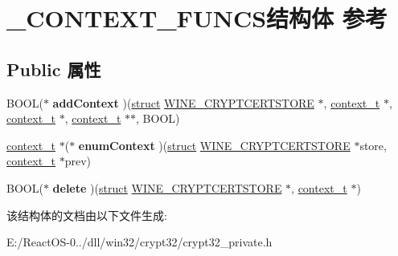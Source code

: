 \hypertarget{struct___c_o_n_t_e_x_t___f_u_n_c_s}{}\section{\+\_\+\+C\+O\+N\+T\+E\+X\+T\+\_\+\+F\+U\+N\+C\+S结构体 参考}
\label{struct___c_o_n_t_e_x_t___f_u_n_c_s}
\subsection*{Public 属性}
\begin{DoxyCompactItemize}
\item 
\mbox{\label{struct___c_o_n_t_e_x_t___f_u_n_c_s_adbf3e6967b6d243a80af35f9530ba387}} 
B\+O\+OL($\ast$ {\bfseries add\+Context} )(\hyperlink{interfacestruct}{struct} \hyperlink{struct_w_i_n_e___c_r_y_p_t_c_e_r_t_s_t_o_r_e}{W\+I\+N\+E\+\_\+\+C\+R\+Y\+P\+T\+C\+E\+R\+T\+S\+T\+O\+RE} $\ast$, \hyperlink{struct__context__t}{context\+\_\+t} $\ast$, \hyperlink{struct__context__t}{context\+\_\+t} $\ast$, \hyperlink{struct__context__t}{context\+\_\+t} $\ast$$\ast$, B\+O\+OL)
\item 
\mbox{\label{struct___c_o_n_t_e_x_t___f_u_n_c_s_a02b977f32759877cb9f82df52c594e1a}} 
\hyperlink{struct__context__t}{context\+\_\+t} $\ast$($\ast$ {\bfseries enum\+Context} )(\hyperlink{interfacestruct}{struct} \hyperlink{struct_w_i_n_e___c_r_y_p_t_c_e_r_t_s_t_o_r_e}{W\+I\+N\+E\+\_\+\+C\+R\+Y\+P\+T\+C\+E\+R\+T\+S\+T\+O\+RE} $\ast$store, \hyperlink{struct__context__t}{context\+\_\+t} $\ast$prev)
\item 
\mbox{\label{struct___c_o_n_t_e_x_t___f_u_n_c_s_a32b8bb2633e24feda73aab08fdc853c7}} 
B\+O\+OL($\ast$ {\bfseries delete} )(\hyperlink{interfacestruct}{struct} \hyperlink{struct_w_i_n_e___c_r_y_p_t_c_e_r_t_s_t_o_r_e}{W\+I\+N\+E\+\_\+\+C\+R\+Y\+P\+T\+C\+E\+R\+T\+S\+T\+O\+RE} $\ast$, \hyperlink{struct__context__t}{context\+\_\+t} $\ast$)
\end{DoxyCompactItemize}


该结构体的文档由以下文件生成\+:\begin{DoxyCompactItemize}
\item 
E\+:/\+React\+O\+S-\/0../dll/win32/crypt32/crypt32\+\_\+private.\+h\end{DoxyCompactItemize}

